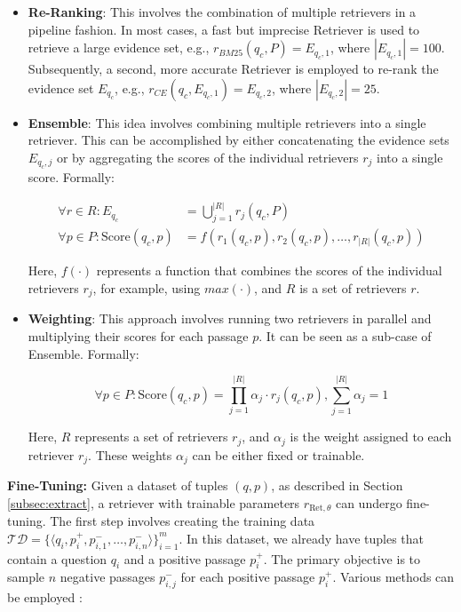 \begin{itemize}
    \item \textbf{Re-Ranking}: This involves the combination of multiple retrievers in a pipeline fashion. In most cases, a fast but imprecise Retriever is used to retrieve a large evidence set, e.g., $r_{BM25}(q_c,P) = E_{q_c,1}$, where $|E_{q_c,1}| = 100$. Subsequently, a second, more accurate Retriever is employed to re-rank the evidence set $E_{q_c}$, e.g., $r_{CE}(q_c,E_{q_c,1}) = E_{q_c,2}$, where $|E_{q_c,2}| = 25$.
    
    \item \textbf{Ensemble}: This idea involves combining multiple retrievers into a single retriever. This can be accomplished by either concatenating the evidence sets $E_{q_c,j}$ or by aggregating the scores of the individual retrievers $r_j$ into a single score. Formally:
    
    \begin{align}
        \forall r \in R: E_{q_c} &= \bigcup_{j=1}^{|R|} r_j(q_c, P) \\
        \forall p \in P: \text{Score}(q_c, p) &= f(r_1(q_c, p), r_2(q_c, p), \dots, r_{|R|}(q_c, p))
    \end{align}
    
    Here, $f(\cdot)$ represents a function that combines the scores of the individual retrievers $r_j$, for example, using $max(\cdot)$, and $R$ is a set of retrievers $r$.
    
    \item \textbf{Weighting}: This approach involves running two retrievers in parallel and multiplying their scores for each passage $p$. It can be seen as a sub-case of Ensemble. Formally:
    
    \begin{equation}
        \forall p \in P: \text{Score}(q_c, p) = \prod_{j=1}^{|R|} \alpha_j \cdot r_j(q_c, p), \sum_{j=1}^{|R|} \alpha_j = 1
    \end{equation}
    
    Here, $R$ represents a set of retrievers $r_j$, and $\alpha_j$ is the weight assigned to each retriever $r_j$. These weights $\alpha_j$ can be either fixed or trainable.
\end{itemize}

\vspace{\baselineskip}

\textbf{Fine-Tuning:} Given a dataset of tuples $(q, p)$, as described in Section \ref{subsec:extract}, a retriever with trainable parameters $r_{\text{Ret}, \theta}$ can undergo fine-tuning. The first step involves creating the training data $\mathcal{TD} = \{\langle q_i, p_i^+, p_{i,1}^-, \dots, p_{i,n}^-\rangle\}_{i=1}^m$. In this dataset, we already have tuples that contain a question $q_i$ and a positive passage $p_i^+$. The primary objective is to sample $n$ negative passages $p_{i,j}^-$ for each positive passage $p_i^+$. Various methods can be employed \cite{karpukhin_dense_2020}:

